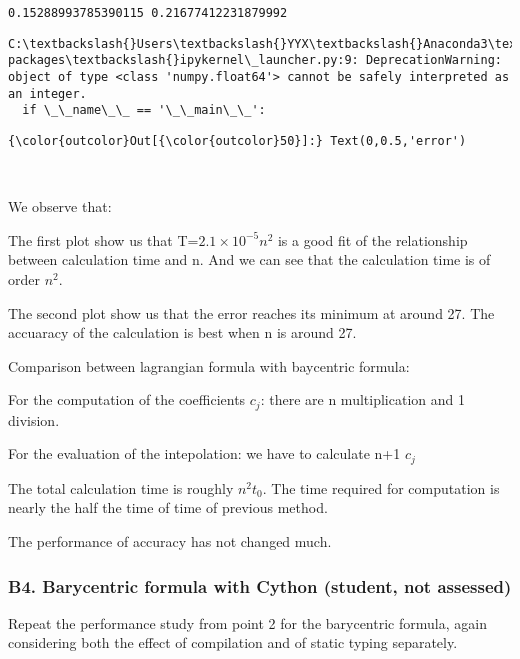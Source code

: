 \documentclass[11pt]{article}
\begin{document}
    \begin{Verbatim}[commandchars=\\\{\}]
0.15288993785390115 0.21677412231879992

    \end{Verbatim}

    \begin{Verbatim}[commandchars=\\\{\}]
C:\textbackslash{}Users\textbackslash{}YYX\textbackslash{}Anaconda3\textbackslash{}lib\textbackslash{}site-packages\textbackslash{}ipykernel\_launcher.py:9: DeprecationWarning: object of type <class 'numpy.float64'> cannot be safely interpreted as an integer.
  if \_\_name\_\_ == '\_\_main\_\_':

    \end{Verbatim}

\begin{Verbatim}[commandchars=\\\{\}]
{\color{outcolor}Out[{\color{outcolor}50}]:} Text(0,0.5,'error')
\end{Verbatim}
            
    \begin{center}
    \end{center}
    { \hspace*{\fill} \\}
    
    We observe that:

The first plot show us that T=\(2.1\times10^{-5} n^2\) is a good fit of
the relationship between calculation time and n. And we can see that the
calculation time is of order \(n^2\).

The second plot show us that the error reaches its minimum at around 27.
The accuaracy of the calculation is best when n is around 27.

    Comparison between lagrangian formula with baycentric formula:

For the computation of the coefficients \(c_j\): there are n
multiplication and 1 division.

For the evaluation of the intepolation: we have to calculate n+1 \(c_j\)

The total calculation time is roughly \(n^2 t_0\). The time required for
computation is nearly the half the time of time of previous method.

The performance of accuracy has not changed much.

    \subsubsection{B4. Barycentric formula with Cython (student, not
assessed)}\label{b4.-barycentric-formula-with-cython-student-not-assessed}

Repeat the performance study from point 2 for the barycentric formula,
again considering both the effect of compilation and of static typing
separately.


    
    
    
    
\end{document}
